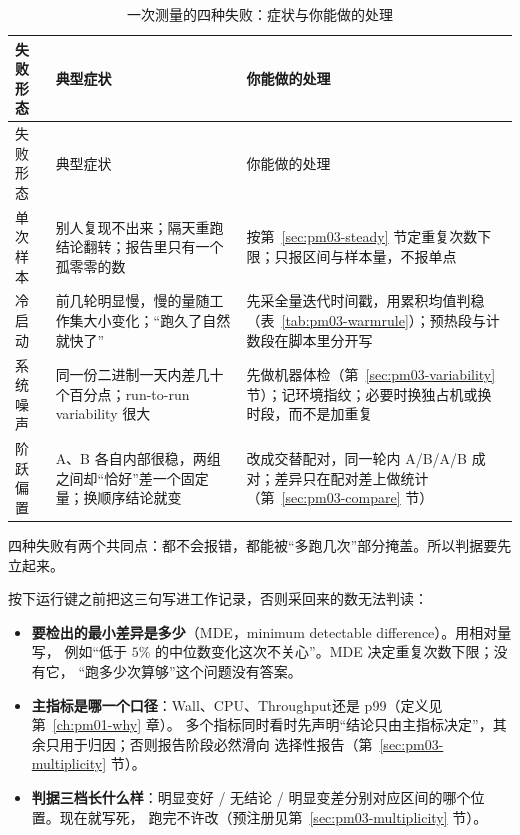 \documentclass[12pt,a4paper,fontset=fandol]{ctexbook}
\newcommand{\Bk}{\discretionary{}{}{}}
\newcommand{\Lang}[1]{\textsf{#1}}
\newcommand{\MWall}{\Lang{Wall}}
\newcommand{\MCpu}{\Lang{CPU}}
\newcommand{\MThr}{\Lang{Throughput}}
\newcommand{\Mx}[1]{\textsf{#1}}
\begin{document}
\begin{longtable}{>{\raggedright\arraybackslash}p{} >{\raggedright\arraybackslash}p{} >{\raggedright\arraybackslash}p{}}
\caption{一次测量的四种失败：症状与你能做的处理}\label{tab:pm03-failure}\\
\toprule
失败形态 & 典型症状 & 你能做的处理 \\
\midrule
\endfirsthead
\toprule
失败形态 & 典型症状 & 你能做的处理 \\
\midrule
\endhead
\bottomrule
\endfoot
\endlastfoot
单次样本 & 别人复现不出来；隔天重跑结论翻转；报告里只有一个孤零零的数 &
按第~\ref{sec:pm03-steady} 节定重复次数下限；只报区间与样本量，不报单点 \\
冷启动 & 前几轮明显慢，慢的量随工作集大小变化；``跑久了自然就快了'' &
先采全量迭代时间戳，用累积均值判稳（表~\ref{tab:pm03-warmrule}）；预热段与计数段在脚本里分开写 \\
系统噪声 & 同一份二进制一天内差几十个百分点；\Mx{run{\Bk}-to{\Bk}-run variability} 很大 &
先做机器体检（第~\ref{sec:pm03-variability} 节）；记环境指纹；必要时换独占机或换时段，而不是加重复 \\
阶跃偏置 & A、B 各自内部很稳，两组之间却``恰好''差一个固定量；换顺序结论就变 &
改成交替配对，同一轮内 A/B/A/B 成对；差异只在配对差上做统计（第~\ref{sec:pm03-compare} 节） \\
\end{longtable}

四种失败有两个共同点：都不会报错，都能被``多跑几次''部分掩盖。所以判据要先立起来。

\begin{guideline}[title={开工前的三个判据}, label={box:pm03-criteria}]
按下运行键之前把这三句写进工作记录，否则采回来的数无法判读：
\begin{itemize}
  \item \textbf{要检出的最小差异是多少}（\Mx{MDE}，minimum detectable difference）。用相对量写，
        例如``低于 $5\%$ 的中位数变化这次不关心''。\Mx{MDE} 决定重复次数下限；没有它，
        ``跑多少次算够''这个问题没有答案。
  \item \textbf{主指标是哪一个口径}：\MWall、\MCpu、\MThr 还是 \Mx{p99}（定义见第~\ref{ch:pm01-why} 章）。
        多个指标同时看时先声明``结论只由主指标决定''，其余只用于归因；否则报告阶段必然滑向
        选择性报告（第~\ref{sec:pm03-multiplicity} 节）。
  \item \textbf{判据三档长什么样}：明显变好 / 无结论 / 明显变差分别对应区间的哪个位置。现在就写死，
        跑完不许改（预注册见第~\ref{sec:pm03-multiplicity} 节）。
\end{itemize}
\end{guideline}
\end{document}
